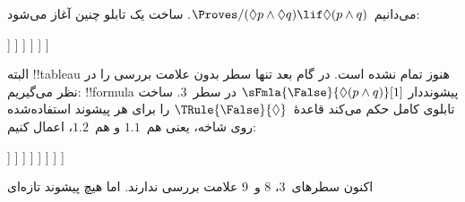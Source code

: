 \documentclass[../../../include/open-logic-section]{subfiles}
\begin{document}
{
\begin{ex}
  می‌دانیم~$\Proves/ (\Diamond p \land \Diamond q) \lif \Diamond(p
  \land q)$. ساخت یک تابلو چنین آغاز می‌شود:
  \begin{oltableau}
    [\pFmla{\False}{(\Diamond p \land \Diamond q) \lif \Diamond(p \land q)}{1},
      just = \TAss, checked
      [\pFmla{\True}{\Diamond p \land \Diamond q}{1},
        just = {\TRule{\False}{\lif}[1]}, checked
        [\pFmla{\False}{\Diamond(p \land q)}{1},
          just = {\TRule{\False}{\lif}[1]}
          [\pFmla{\True}{\Diamond p}{1},
            just = {\TRule{\True}{\land}[2]}, checked
            [\pFmla{\True}{\Diamond q}{1},
              just = {\TRule{\True}{\land}[2]}, checked
              [\pFmla{\True}{p}{1.1}, 
                just = {\TRule{\True}{\Diamond}[4]}, checked
                [\pFmla{\True}{q}{1.2}, 
                  just = {\TRule{\True}{\Diamond}[5]}, checked
                ]
              ]
            ]
          ]
        ]
      ]
    ]
  \end{oltableau}
  البته !!{tableau} هنوز تمام نشده است. در گام بعد تنها سطر بدون
  علامت بررسی را در نظر می‌گیریم: !!{formula} پیشونددار
  $\sFmla{\False}{\Diamond(p \land q)}[1]$ در سطر~$3$. ساخت تابلوی
  کامل حکم می‌کند قاعدهٔ~$\TRule{\False}{\Diamond}$ را برای هر پیشوند
  استفاده‌شده روی شاخه، یعنی هم~$1.1$ و هم~$1.2$، اعمال کنیم:
  \begin{oltableau}
    [\pFmla{\False}{(\Diamond p \land \Diamond q) \lif \Diamond(p \land q)}{1},
      just = \TAss, checked
      [\pFmla{\True}{\Diamond p \land \Diamond q}{1},
        just = {\TRule{\False}{\lif}[1]}, checked
        [\pFmla{\False}{\Diamond (p \land q)}{1},
          just = {\TRule{\False}{\lif}[1]}
          [\pFmla{\True}{\Diamond p}{1},
            just = {\TRule{\True}{\land}[2]}, checked
            [\pFmla{\True}{\Diamond q}{1},
              just = {\TRule{\True}{\land}[2]}, checked
              [\pFmla{\True}{p}{1.1}, 
                just = {\TRule{\True}{\Diamond}[4]}, checked
                [\pFmla{\True}{q}{1.2}, 
                  just = {\TRule{\True}{\Diamond}[5]}, checked
                  [\pFmla{\False}{p \land q}{1.1}, 
                    just = {\TRule{\False}{\Diamond}[3]}
                    [\pFmla{\False}{p \land q}{1.2}, 
                      just = {\TRule{\False}{\Diamond}[3]}
                    ]
                  ]
                ]
              ]
            ]
          ]
        ]
      ]
    ]
  \end{oltableau}
  اکنون سطرهای~3، 8 و~9 علامت بررسی ندارند. اما هیچ پیشوند تازه‌ای

\end{ex}}
\end{document}
